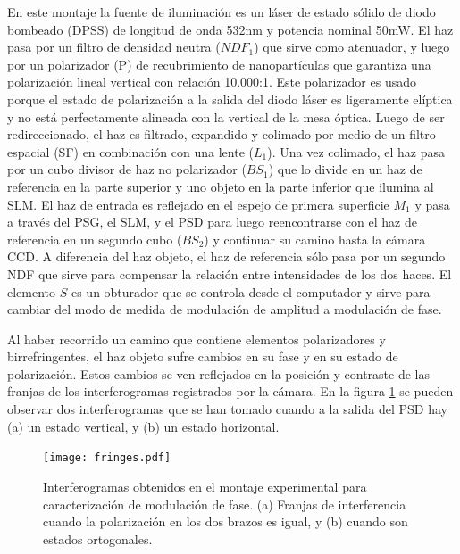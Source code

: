 En este montaje la fuente de iluminación es un láser de estado sólido
de diodo bombeado (DPSS) de longitud de onda 532nm y potencia nominal
50mW. El haz pasa por un filtro de densidad neutra ($NDF_1$) que sirve como
atenuador, y luego por un polarizador (P) de recubrimiento de
nanopartículas que garantiza una polarización lineal vertical con
relación  10.000:1. Este polarizador es usado porque el estado de
polarización a la salida del diodo láser es ligeramente elíptica y no
está perfectamente alineada con la vertical de la mesa óptica. 
Luego de ser redireccionado, el haz es filtrado, expandido y colimado
por medio de un filtro espacial (SF) en combinación con una lente
($L_1$). Una vez colimado, el haz pasa por un cubo divisor de haz no
polarizador ($BS_1$) que lo divide en un haz de referencia en la parte
superior y uno objeto en la parte inferior que ilumina
al SLM. El haz de entrada es reflejado en el espejo de primera
superficie $M_1$ y pasa a través del PSG, el SLM, y el PSD para luego
reencontrarse con el haz de referencia en un segundo cubo ($BS_2$) y
continuar su camino hasta la cámara CCD. A diferencia del haz objeto,
el haz de referencia sólo pasa por un segundo NDF que sirve para
compensar la relación entre intensidades de los dos haces. El elemento
$S$ es un obturador que se controla desde el computador y sirve para cambiar
del modo de medida de modulación de amplitud a modulación de fase.  

Al haber recorrido un camino que contiene elementos polarizadores y
birrefringentes, el haz objeto sufre cambios en su fase y en su estado
de polarización. Estos cambios se ven reflejados en la posición y
contraste de las franjas de los interferogramas registrados por la
cámara. En la figura \ref{fig:fringes} se pueden observar dos
interferogramas que se han tomado cuando a la salida del PSD hay (a)
un estado vertical, y (b) un estado horizontal.  
\begin{figure}[h!]
\centering
\texttt{[image: fringes.pdf]}
\caption[Interferogramas obtenidos en el montaje experimental para
caracterización de modulación de fase]{Interferogramas obtenidos en el montaje experimental para
caracterización de modulación de fase. (a) Franjas de interferencia
cuando la polarización en los dos brazos es igual, y (b) cuando son
estados ortogonales.}
\label{fig:fringes}
\end{figure}

